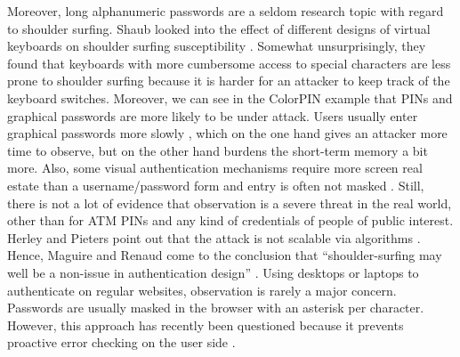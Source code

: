 Moreover, long alphanumeric passwords are a seldom research topic with regard to shoulder surfing. Shaub \etal looked into the effect of different designs of virtual keyboards on shoulder surfing susceptibility \cite{Schaub2012PasswordShoulderSurfing}. Somewhat unsurprisingly, they found that keyboards with more cumbersome access to special characters are less prone to shoulder surfing because it is harder for an attacker to keep track of the keyboard switches. Moreover, we can see in the ColorPIN example that PINs and graphical passwords are more likely to be under attack. Users usually enter graphical passwords more slowly \cite{Tari2006ShoulderSurfingComparison, Wiedenbeck2006ConvexHull, Renaud2009VisualSnakeOil}, which on the one hand gives an attacker more time to observe, but on the other hand burdens the short-term memory a bit more. Also, some visual authentication mechanisms require more screen real estate than a username/password form and entry is often not masked \cite{Biddle2009GraphicalFirstTwelveYears}. Still, there is not a lot of evidence that observation is a severe threat in the real world, other than for ATM PINs and any kind of credentials of people of public interest. Herley and Pieters point out that the attack is not scalable via algorithms \cite{Herley2015Counterfactuals}. Hence, Maguire and Renaud come to the conclusion that ``shoulder-surfing may well be a non-issue in authentication design'' \cite{Maguire2012YouOnlyLiveTwice}. 
Using desktops or laptops to authenticate on regular websites, observation is rarely a major concern. Passwords are usually masked in the browser with an asterisk per character. However, this approach has recently been questioned because it prevents proactive error checking on the user side \cite{Sasse2016DebunkingMyths}. 


